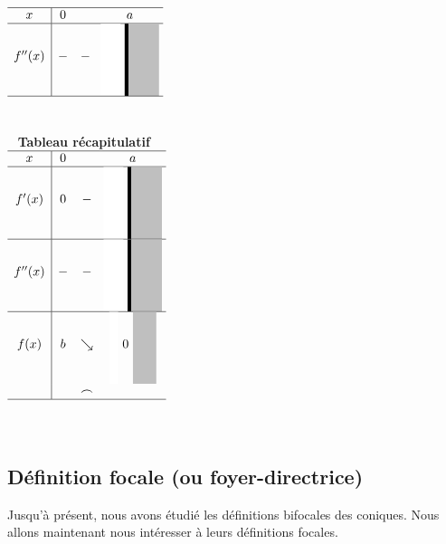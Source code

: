 \begin{eleve}
$
\begin{array}{c|c c c}
\hline
x & 0 & & a \\
\hline
f''(x) & - & - & 
\makebox[1.5cm]{%
  \raisebox{-0.5\height}{\color{white!50}\rule{0.55cm}{2cm}}
  \raisebox{-0.5\height}{\rule{3pt}{2cm}}%
  \raisebox{-0.5\height}{\color{gray!50}\rule{0.85cm}{2cm}}%
}   \\
\hline
\end{array}
$\\
\\~
\\~
\textbf{Tableau récapitulatif}\\
$
\begin{array}{c|c c c}
\hline
x & 0 & & a \\
\hline
f'(x) & 0 & - & 
\makebox[1.5cm]{%
  \raisebox{-0.5\height}{\color{white!50}\rule{0.55cm}{2cm}}
  \raisebox{-0.5\height}{\rule{3pt}{2cm}}%
  \raisebox{-0.5\height}{\color{gray!50}\rule{0.85cm}{2cm}}%
}   \\
\hline
f''(x) & - & - & 
\makebox[1.5cm]{%
  \raisebox{-0.5\height}{\color{white!50}\rule{0.55cm}{2cm}}
  \raisebox{-0.5\height}{\rule{3pt}{2cm}}%
  \raisebox{-0.5\height}{\color{gray!50}\rule{0.85cm}{2cm}}%
}   \\
\hline
f(x) & b & \searrow  & 
\makebox[1.5cm]{%
  \raisebox{-0.5\height}{\color{white!50}\rule{0.25cm}{2cm}}
  0
  \raisebox{-0.5\height}{\color{gray!50}\rule{0.65cm}{2cm}}%
}   \\
 & & \frown&\\
\hline
\end{array}
$\\
\\~

\end{eleve}

\newpage

\subsection{Définition focale (ou foyer-directrice)}\label{section:ellmonofo}
Jusqu’à présent, nous avons étudié les définitions bifocales des coniques. 
Nous allons maintenant nous intéresser à leurs définitions focales.

